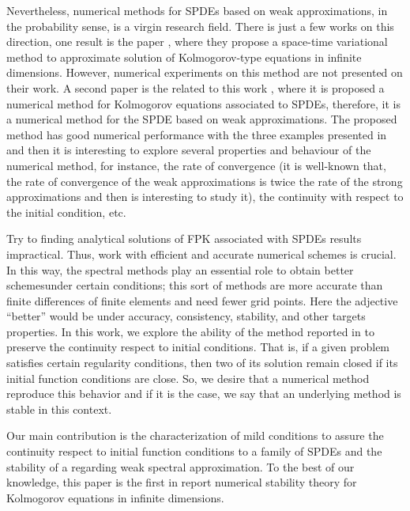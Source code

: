 \documentclass[]{interact}
\theoremstyle{plain}%
\theoremstyle{definition}
\theoremstyle{remark}
\begin{document}
     Nevertheless, numerical methods for SPDEs based on weak approximations, in the probability sense, is a virgin research field.  There is just a few works on this direction, one result is the paper \cite{schwab2013adaptive}, where they propose a space-time variational method to approximate solution of Kolmogorov-type equations in infinite dimensions. However, numerical experiments on this method are not presented on their work. A second paper is the related to this work \cite{de-fl}, where it is proposed a numerical method for Kolmogorov equations associated to SPDEs, therefore, it is a numerical method for the SPDE based on weak approximations. The proposed method has good numerical performance with the three examples presented in \cite{de-fl} and then it is interesting to explore several properties and behaviour of the numerical method, for instance, the rate of convergence (it is well-known that, the rate of convergence of the weak approximations is twice the rate of the strong approximations and then is interesting to study it), the continuity with respect to the initial condition, etc. 
    
        Try to finding analytical solutions of FPK associated with SPDEs results
    impractical. Thus, work with efficient and accurate numerical schemes is 
    crucial. In this way, the spectral methods play an essential role to obtain 
    better schemes\textemdash under certain conditions; this sort of methods 
    are  more accurate than finite differences of finite elements and need 
    fewer grid points. Here the adjective ``better'' would be under accuracy, 
    consistency, stability, and other targets properties. In this work, we 
    explore the ability of the method reported in \cite{de-fl} to preserve the 
    continuity respect to initial conditions. That is, if a given problem 
    satisfies certain regularity conditions, then two of its solution remain 
    closed if its initial function conditions are close. So, we desire that a 
    numerical method reproduce this 
    behavior and if it is the case, we say that an underlying method is stable 
    in this context.
    
   
    
        Our main contribution is the characterization of mild conditions to
    assure the continuity respect to initial function conditions to a family of
    SPDEs and the stability of a regarding weak spectral approximation. 
    To the best of our knowledge, this paper is the first in report numerical 
    stability theory for Kolmogorov equations in infinite dimensions.
    
\end{document}
